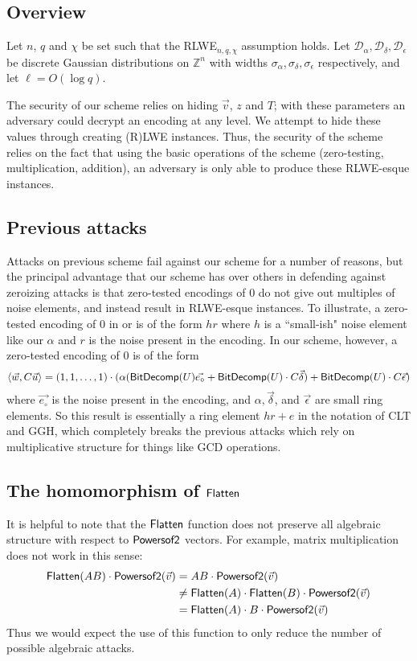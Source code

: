 \subsection{Overview}

Let $n$, $q$ and $\chi$ be set such that the RLWE$_{n,q,\chi}$ assumption holds.  Let $\mathcal{D}_\alpha, \mathcal{D}_\delta, \mathcal{D}_\epsilon$ be discrete Gaussian distributions on $\mathbb{Z}^n$ with widths $\sigma_\alpha, \sigma_\delta, \sigma_\epsilon$ respectively, and let $\ell = O(\log q)$.  

The security of our scheme relies on hiding $\vec{v}$, $z$ and $T$; with these parameters an adversary could decrypt an encoding at any level.  We attempt to hide these values through creating (R)LWE instances.  Thus, the security of the scheme relies on the fact that using the basic operations of the scheme (zero-testing, multiplication, addition), an adversary is only able to produce these RLWE-esque instances.  

\subsection{Previous attacks}
Attacks on previous scheme \cite{chl,cgh,hj} fail against our scheme for a number of reasons, but the principal advantage that our scheme has over others in defending against zeroizing attacks is that zero-tested encodings of $0$ do not give out multiples of noise elements, and instead result in RLWE-esque instances.  To illustrate, a zero-tested encoding of $0$ in \cite{clt} or \cite{ggh13a} is of the form $hr$ where $h$ is a ``small-ish" noise element like our $\alpha$ and $r$ is the noise present in the encoding.  In our scheme, however, a zero-tested encoding of $0$ is of the form
$$\left<\vec{w}, C \vec{u}\right> = (1,1,\ldots, 1)\cdot(\alpha (\mathsf{BitDecomp}(U)\vec{e_{\circ}} + \mathsf{BitDecomp}(U)\cdot C\vec{\delta}) + \mathsf{BitDecomp}(U)\cdot C\vec{\epsilon})$$
where $\vec{e_{\circ}}$ is the noise present in the encoding, and $\alpha, \vec{\delta}$, and $\vec{\epsilon}$ are small ring elements.  So this result is essentially a ring element $hr + e$ in the notation of CLT and GGH, which completely breaks the previous attacks which rely on multiplicative structure for things like GCD operations. 

\subsection{The homomorphism of $\mathsf{Flatten}$}

It is helpful to note that the $\mathsf{Flatten}$ function does not preserve all algebraic structure with respect to $\mathsf{Powersof2}$ vectors.  For example, matrix multiplication does not work in this sense:
\begin{align*}
\mathsf{Flatten}(AB)\cdot \mathsf{Powersof2}(\vec{v}) &= AB \cdot \mathsf{Powersof2}(\vec{v})\\
&\not= \mathsf{Flatten}(A)\cdot \mathsf{Flatten}(B)\cdot \mathsf{Powersof2}(\vec{v})\\ 
&= \mathsf{Flatten}(A)\cdot B\cdot \mathsf{Powersof2}(\vec{v})
\end{align*}
Thus we would expect the use of this function to only reduce the number of possible algebraic attacks.

